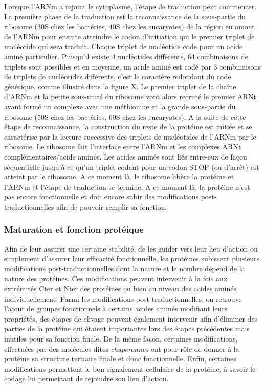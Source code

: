 Lorsque l'ARNm a rejoint le cytoplasme, l'étape de traduction peut commencer. La première phase de la traduction est la reconnaissance de la sous-partie du ribosome (30S chez les bactéries, 40S chez les eucaryotes) de la région en amont de l'ARNm pour ensuite atteindre le codon d'initiation qui le premier triplet de nucléotide qui sera traduit. Chaque triplet de nucléotide code pour un acide aminé particulier. Puisqu'il existe 4 nucléotides différents, 64 combinaisons de triplets sont possibles et en moyenne, un acide aminé est codé par 3 combinaisons de triplets de nucléotides différents, c'est le caractère redondant du code génétique, comme illustré dans la figure X. 
Le premier triplet de la chaîne d'ARNm et la petite sous-unité du ribosome vont alors recruté le premier ARNt ayant formé un complexe avec une méthionine et la grande sous-partie du ribosome (50S chez les bactéries, 60S chez les eucaryotes). A la suite de cette étape de reconnaissance, la construction du reste de la protéine est initiée et se caractérise par la lecture successive des triplets de nucléotides de l'ARNm par le ribosome. Le ribosome fait l'interface entre l'ARNm et les complexes ARNt complémentaires/acide aminés. Les acides aminés sont liés entre-eux de façon séquentielle jusqu'à ce qu'un triplet codant pour un codon STOP (ou d'arrêt) est atteint par le ribosome. A ce moment là, le ribosome libère la protéine et l'ARNm et l'étape de traduction se termine. A ce moment là, la protéine n'est pas encore fonctionnelle et doit encore subir des modifications post-traductionnelles afin de pouvoir remplir sa fonction.

\subsubsection{Maturation et fonction protéique}

Afin de leur assurer une certaine stabilité, de les guider vers leur lieu d'action ou simplement d'assurer leur efficacité fonctionnelle, les protéines subissent plusieurs modifications post-traductionnelles dont la nature et le nombre dépend de la nature des protéines. Ces modifications peuvent intervenir à la fois aux extrémités Cter et Nter des protéines ou bien au niveau des acides aminés individuellement. Parmi les modifications post-traductionnelles, on retrouve l'ajout de groupes fonctionnels à certains acides aminés modifiant leurs propriétés, des étapes de clivage peuvent également intervenir afin d'éliminer des parties de la protéine qui étaient importantes lors des étapes précédentes mais inutiles pour sa fonction finale. De la même façon, certaines modifications, effectuées par des molécules dites \textit{chaperonnes} ont pour rôle de donner à la protéine sa structure tertiaire finale et donc fonctionnelle. Enfin, certaines modifications permettent le bon signalement cellulaire de la protéine, à savoir le codage lui permettant de rejoindre son lieu d'action.

